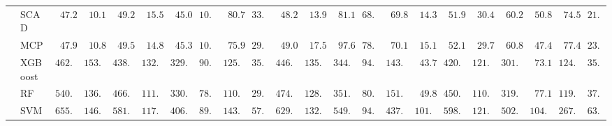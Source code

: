 \begin{tabular}{llllllllllllllllllllll}
	& SCAD  & $\phantom{0}47.25$ & $\phantom{0}10.14$ & $\phantom{0}49.26$ & $\phantom{0}15.59$ & $\phantom{0}45.05$ & $10.33$ & $\phantom{0}80.73$ & $33.47$ & $\phantom{0}48.21$ & $\phantom{0}13.95$ & $\phantom{0}81.17$ & $68.26$ & $\phantom{0}69.82$ & $\phantom{0}14.39$ & $\phantom{0}51.96$ & $\phantom{0}30.40$ & $\phantom{0}60.25$ & $\phantom{0}50.84$ & $\phantom{0}74.52$ & $21.16$ \\
	& MCP  & $\phantom{0}47.96$ & $\phantom{0}10.83$ & $\phantom{0}49.51$ & $\phantom{0}14.84$ & $\phantom{0}45.32$ & $10.14$ & $\phantom{0}75.98$ & $29.39$ & $\phantom{0}49.06$ & $\phantom{0}17.54$ & $\phantom{0}97.64$ & $78.45$ & $\phantom{0}70.14$ & $\phantom{0}15.10$ & $\phantom{0}52.12$ & $\phantom{0}29.79$ & $\phantom{0}60.81$ & $\phantom{0}47.45$ & $\phantom{0}77.41$ & $23.86$ \\
	& XGBoost  & $462.42$ & $153.08$ & $438.75$ & $132.30$ & $329.77$ & $90.89$ & $125.16$ & $35.21$ & $446.56$ & $135.46$ & $344.83$ & $94.89$ & $143.48$ & $\phantom{0}43.70$ & $420.52$ & $121.39$ & $301.37$ & $\phantom{0}73.14$ & $124.61$ & $35.86$ \\
	& RF  & $540.97$ & $136.58$ & $466.03$ & $111.18$ & $330.46$ & $78.76$ & $110.13$ & $29.18$ & $474.40$ & $128.25$ & $351.13$ & $80.23$ & $151.07$ & $\phantom{0}49.86$ & $450.25$ & $110.50$ & $319.58$ & $\phantom{0}77.19$ & $119.52$ & $37.83$ \\
	& SVM  & $655.71$ & $146.59$ & $581.13$ & $117.87$ & $406.59$ & $89.66$ & $143.00$ & $57.08$ & $629.70$ & $132.87$ & $549.67$ & $94.82$ & $437.80$ & $101.11$ & $598.30$ & $121.48$ & $502.02$ & $104.82$ & $267.80$ & $63.93$ \\
	\hline 
\end{tabular}
